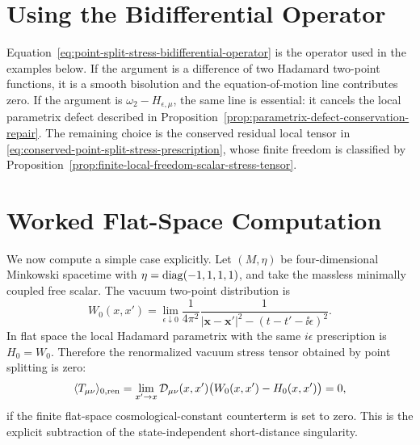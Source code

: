 \section{Using the Bidifferential Operator}

Equation~\eqref{eq:point-split-stress-bidifferential-operator} is the
operator used in the examples below.  If the argument is a difference of two
Hadamard two-point functions, it is a smooth bisolution and the
equation-of-motion line contributes zero.  If the argument is
\(\omega_2-H_{\epsilon,\mu}\), the same line is essential: it cancels the
local parametrix defect described in
Proposition~\ref{prop:parametrix-defect-conservation-repair}.  The remaining
choice is the conserved residual local tensor in
\eqref{eq:conserved-point-split-stress-prescription}, whose finite freedom is
classified by
Proposition~\ref{prop:finite-local-freedom-scalar-stress-tensor}.

\section{Worked Flat-Space Computation}

We now compute a simple case explicitly.  Let
\((M,\eta)\) be four-dimensional Minkowski spacetime with
\(\eta={\rm diag}(-1,1,1,1)\), and take the massless minimally coupled free
scalar.  The vacuum two-point distribution is
\[
  W_0(x,x')
  =
  \lim_{\epsilon\downarrow0}
  \frac{1}{4\pi^2}
  \frac{1}{
  |\mathbf x-\mathbf x'|^2-(t-t'-\ii\epsilon)^2}.
\]
In flat space the local Hadamard parametrix with the same \(i\epsilon\)
prescription is \(H_0=W_0\).  Therefore the renormalized vacuum stress
tensor obtained by point splitting is zero:
\[
  \langle T_{\mu\nu}\rangle_{0,{\rm ren}}
  =
  \lim_{x'\to x}
  \mathcal D_{\mu\nu}(x,x')\bigl(W_0(x,x')-H_0(x,x')\bigr)
  =
  0 ,
\]
if the finite flat-space cosmological-constant counterterm is set to zero.
This is the explicit subtraction of the state-independent short-distance
singularity.

